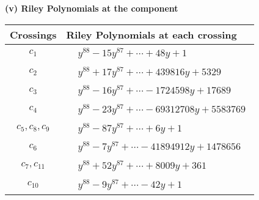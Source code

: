 \documentclass[1p]{elsarticle_modified}
\theoremstyle{definition}
\begin{document}
\newpage\renewcommand{\arraystretch}{1}
\flushleft \textbf{(v) Riley Polynomials at the component}\newline \\
\begin{tabular}{m{50pt}|m{274pt}}
Crossings & \hspace{64pt}Riley Polynomials at each crossing \\
\hline $$\begin{aligned}c_{1}\end{aligned}$$&$\begin{aligned}
&y^{88}-15 y^{87}+\cdots+48 y+1
\end{aligned}$\\
\hline $$\begin{aligned}c_{2}\end{aligned}$$&$\begin{aligned}
&y^{88}+17 y^{87}+\cdots+439816 y+5329
\end{aligned}$\\
\hline $$\begin{aligned}c_{3}\end{aligned}$$&$\begin{aligned}
&y^{88}-16 y^{87}+\cdots-1724598 y+17689
\end{aligned}$\\
\hline $$\begin{aligned}c_{4}\end{aligned}$$&$\begin{aligned}
&y^{88}-23 y^{87}+\cdots-69312708 y+5583769
\end{aligned}$\\
\hline $$\begin{aligned}c_{5},c_{8},c_{9}\end{aligned}$$&$\begin{aligned}
&y^{88}-87 y^{87}+\cdots+6 y+1
\end{aligned}$\\
\hline $$\begin{aligned}c_{6}\end{aligned}$$&$\begin{aligned}
&y^{88}-7 y^{87}+\cdots-41894912 y+1478656
\end{aligned}$\\
\hline $$\begin{aligned}c_{7},c_{11}\end{aligned}$$&$\begin{aligned}
&y^{88}+52 y^{87}+\cdots+8009 y+361
\end{aligned}$\\
\hline $$\begin{aligned}c_{10}\end{aligned}$$&$\begin{aligned}
&y^{88}-9 y^{87}+\cdots-42 y+1
\end{aligned}$\\
\hline
\end{tabular}\\~\\
\end{document}
